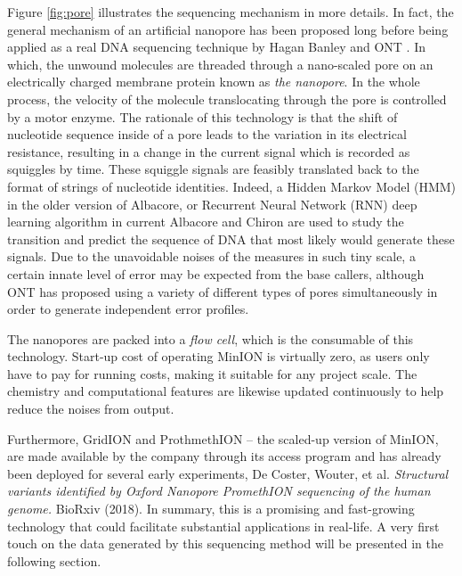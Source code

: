 Figure \ref{fig:pore} illustrates the sequencing mechanism in more details.
In fact, the general mechanism of an artificial nanopore has been proposed \cite{Kasianowicz1996,Church1998} long before being applied as a real DNA sequencing technique by Hagan Banley and ONT \cite{Clarke2009}. 
In which, the unwound molecules are threaded through a nano-scaled pore on an electrically charged membrane protein known as \emph{the nanopore}. 
In the whole process, the velocity of the molecule translocating through the pore is controlled by a motor enzyme.
The rationale of this technology is that the shift of nucleotide sequence inside of a pore leads to the variation in its electrical resistance, resulting in a change in the current signal which is recorded as squiggles by time. These squiggle signals are feasibly translated back to the format of strings of nucleotide identities.
Indeed, a Hidden Markov Model (HMM) \cite{Baum1966,Baum1970} in the older version of Albacore, or Recurrent Neural Network (RNN) deep learning algorithm in current Albacore and Chiron \cite{teng2018chiron} are used to study the transition and predict the sequence of DNA that most likely would generate these signals. 
Due to the  unavoidable noises of the measures in such tiny scale, a certain innate level of error may be expected from the base callers, although ONT has proposed using a variety of different types of pores simultaneously in order to generate independent error profiles. 

The nanopores are packed into a \emph{flow cell}, which is the consumable of this technology. Start-up cost of operating MinION is virtually zero, as users only have to pay for running costs, making it suitable for any project scale.  
The chemistry and computational features are likewise updated continuously to help reduce the noises from output. 

Furthermore, GridION and ProthmethION -- the scaled-up version of MinION, are made available by the company through its access program and has already been deployed for several early experiments, \EG{} De Coster, Wouter, et al. \emph{Structural variants identified by Oxford Nanopore PromethION sequencing of the human genome.} BioRxiv (2018).
In summary, this is a promising and fast-growing technology that could facilitate substantial applications in real-life.
A very first touch on the data generated by this sequencing method will be presented in the following section.
